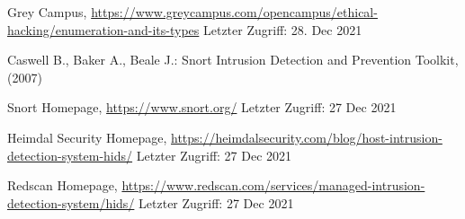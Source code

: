 \begin{thebibliography}{8}
Grey Campus, \url{https://www.greycampus.com/opencampus/ethical-hacking/enumeration-and-its-types} Letzter Zugriff: 28. Dec 2021

Caswell B., Baker A., Beale J.: Snort Intrusion Detection and Prevention Toolkit,
(2007)

Snort Homepage, \url{https://www.snort.org/} Letzter Zugriff: 27 Dec 2021

Heimdal Security Homepage, \url{https://heimdalsecurity.com/blog/host-intrusion-detection-system-hids/} Letzter Zugriff: 27 Dec 2021

Redscan Homepage, \url{https://www.redscan.com/services/managed-intrusion-detection-system/hids/} Letzter Zugriff: 27 Dec 2021









\end{thebibliography}
